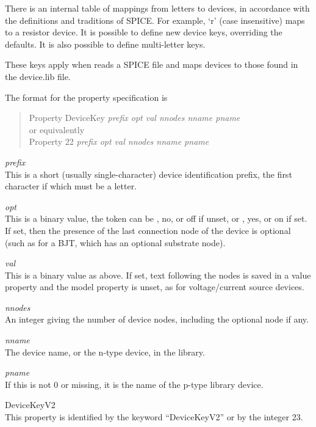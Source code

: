 \begin{description}
There is an internal table of mappings from letters to devices, in
accordance with the definitions and traditions of SPICE.  For example,
`{\vt r}' (case insensitive) maps to a resistor device.  It is
possible to define new device keys, overriding the defaults.  It is
also possible to define multi-letter keys.

These keys apply when {\Xic} reads a SPICE file and maps devices to
those found in the {\vt device.lib} file.

The format for the property specification is
\begin{quote}
{\vt Property DeviceKey} {\it prefix opt val nnodes nname pname}\\
or equivalently\\
{\vt Property 22} {\it prefix opt val nnodes nname pname}
\end{quote}

\begin{description}
\item{\it prefix}\\
This is a short (usually single-character) device identification prefix,
the first character if which must be a letter.
\item{\it opt}\\
This is a binary value, the token can be {}, {\vt no}, or {\vt
off} if unset, or {}, {\vt yes}, or {\vt on} if set.  If set,
then the presence of the last connection node of the device is
optional (such as for a BJT, which has an optional substrate node).
\item{\it val}\\
This is a binary value as above.  If set, text following the nodes is
saved in a {\cb value} property and the {\cb model} property is unset,
as for voltage/current source devices.
\item{\it nnodes}\\
An integer giving the number of device nodes, including the optional
node if any.
\item{\it nname}\\
The device name, or the n-type device, in the library.
\item{\it pname}\\
If this is not 0 or missing, it is the name of the p-type library
device.
\end{description}

\item{\vt DeviceKeyV2}\\
This property is identified by the keyword ``{\vt DeviceKeyV2}'' or by
the integer 23.


\end{description}
